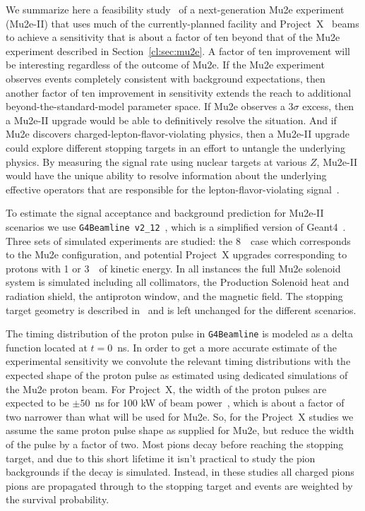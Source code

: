 
%

We summarize here a feasibility study~\cite{Mu2eII} of a
next-generation Mu2e experiment (Mu2e-II) that uses much of the
currently-planned facility and Project~X~\cite{ProjectX} beams to
achieve a sensitivity that is about a factor of ten beyond that of the
Mu2e experiment described in Section~\ref{cl:sec:mu2e}. A factor of
ten improvement will be interesting regardless of the outcome of Mu2e.
If the Mu2e experiment observes events completely consistent with
background expectations, then another factor of ten improvement in
sensitivity extends the reach to additional beyond-the-standard-model
parameter space.  If Mu2e observes a $3\sigma$ excess, then a Mu2e-II
upgrade would be able to definitively resolve the situation.  And if
Mu2e discovers charged-lepton-flavor-violating physics, then a Mu2e-II
upgrade could explore different stopping targets in an effort to
untangle the underlying physics.  By measuring the signal rate using
nuclear targets at various $Z$, Mu2e-II would have the unique ability
to resolve information about the underlying effective operators that
are responsible for the lepton-flavor-violating
signal~\cite{Kitano:2002mt,Cirigliano:2009bz}.



%
To estimate the signal acceptance and background prediction for
Mu2e-II scenarios we use \texttt{G4Beamline v2\_12}~\cite{g4bl}, which
is a simplified version of Geant4~\cite{GEANT4}.  Three sets of
simulated experiments are studied: the 8~\gev\ case which corresponds
to the Mu2e configuration, and potential Project~X upgrades
corresponding to protons with 1 or 3~\gev\ of kinetic energy.  In all
instances the full Mu2e solenoid system is simulated including all
collimators, the Production Solenoid heat and radiation shield, the
antiproton window, and the magnetic field.  The stopping target
geometry is described in~\cite{Mu2eCDR} and is left unchanged for the
different scenarios.
 

The timing distribution of the proton pulse in \texttt{G4Beamline} is
modeled as a delta function located at $t = 0$~ns.  In order to get a
more accurate estimate of the experimental sensitivity we convolute
the relevant timing distributions with the expected shape of the
proton pulse as estimated using dedicated simulations of the Mu2e
proton beam.  For Project~X, the width of the proton pulses are
expected to be $\pm 50$~ns for 100 kW of beam power~\cite{bobT}, which is
about a factor of two narrower than what will be used for Mu2e.  So,
for the Project~X studies we assume the same proton pulse shape as
supplied for Mu2e, but reduce the width of the pulse by a factor of
two.  Most pions decay before reaching the stopping target, and due to
this short lifetime it isn't practical to study the pion backgrounds
if the decay is simulated.  Instead, in these studies all charged
pions pions are propagated through to the stopping target and events
are weighted by the survival probability.
 

